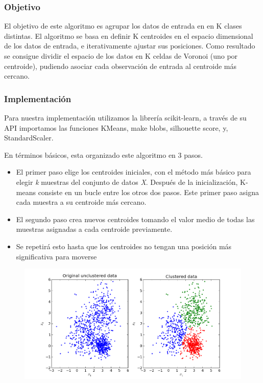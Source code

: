\documentclass[journal]{IEEEtran}
\begin{document}
            \vspace*{2mm}
            \subsubsection{Objetivo}
            
            El objetivo de este algoritmo es agrupar los datos de entrada en en K clases distintas. El algoritmo se basa en definir K centroides en el espacio dimensional de los datos de entrada, e iterativamente ajustar sus posiciones. Como resultado se consigue dividir el espacio de los datos en  K celdas de Voronoi (uno por centroide), pudiendo asociar cada observación de entrada al centroide más cercano. \cite{datacamp}
            
            \vspace*{2mm}
            \subsubsection{Implementación}
            
                Para nuestra implementación utilizamos la librería scikit-learn, a través de su API importamos las funciones KMeans, make blobs,  silhouette score, y, StandardScaler.
                
                En términos básicos, esta organizado este algoritmo en 3 pasos. \cite{kmeans} 
                \begin{itemize}
                    \item El primer paso elige los centroides iniciales, con el método más básico para elegir \textit{k} muestras del conjunto de datos \textit{X}. Después de la inicialización, K-means consiste en un bucle entre los otros dos pasos. Este primer paso asigna cada muestra a su centroide más cercano.
                    \item El segundo paso crea nuevos centroides tomando el valor medio de todas las muestras asignadas a cada centroide previamente. 
                    \item Se repetirá esto hasta que los centroides no tengan una posición más significativa para moverse
                \end{itemize}
                
                \begin{figure}[h]
                    \centering
                    \includegraphics[scale=0.38]{img/kmeans.png}
                \end{figure}
 
\end{document}
